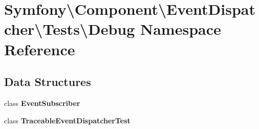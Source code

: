 \section{Symfony\textbackslash{}Component\textbackslash{}Event\+Dispatcher\textbackslash{}Tests\textbackslash{}Debug Namespace Reference}
\label{namespace_symfony_1_1_component_1_1_event_dispatcher_1_1_tests_1_1_debug}
\subsection*{Data Structures}
\begin{DoxyCompactItemize}
\item 
class {\bf Event\+Subscriber}
\item 
class {\bf Traceable\+Event\+Dispatcher\+Test}
\end{DoxyCompactItemize}
